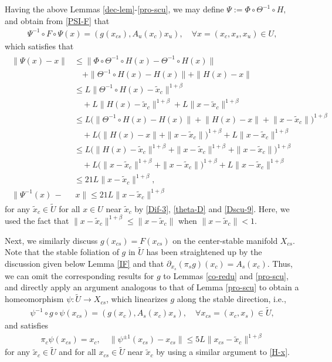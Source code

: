 \documentclass[reqno]{amsart}
\numberwithin{equation}{section}
\begin{document}
Having the above Lemmas \ref{dec-lem}-\ref{pro-scu}, we may define
$
\Psi:=\Phi\circ \Theta^{-1}\circ H,
$
and obtain from \eqref{PSI-F} that
\begin{align}\label{lin-u}
\Psi^{-1}\circ F\circ \Psi(x)=(g(x_{cs}),A_u(x_c)x_u),\quad \forall x=(x_{c},x_s, x_u)\in U,
\end{align}
which satisfies that
\begin{align}\label{H-x}
\begin{split}
\|\Psi(x)-x\|
&\le \|\Phi\circ \Theta^{-1}\circ H(x)-\Theta^{-1}\circ H(x)\|
\\
&\quad +\|\Theta^{-1}\circ H(x)-H(x)\|+\|H(x)-x\|
\\
&\le L\|\Theta^{-1}\circ H(x)-\tilde x_c\|^{1+\beta}
\\
&\quad +L\|H(x)-\tilde x_c\|^{1+\beta}+L\|x-\tilde x_c\|^{1+\beta}
\\
&\le L\Big(\|\Theta^{-1}\circ H(x)\!-\!H(x)\|\!+\!\|H(x)\!-\!x\|\!+\!\|x\!-\!\tilde x_c\|\Big)^{1+\beta}
\\
&\quad+L\Big(\|H(x)-x\|+\|x-\tilde x_c\|\Big)^{1+\beta}+L\|x-\tilde x_c\|^{1+\beta}
\\
&\le L\Big(\|H(x)-\tilde x_c\|^{1+\beta}+\|x-\tilde x_c\|^{1+\beta}+\|x-\tilde x_c\|\Big)^{1+\beta}
\\
&\quad+L\Big(\|x-\tilde x_c\|^{1+\beta}+\|x-\tilde x_c\|\Big)^{1+\beta}+L\|x-\tilde x_c\|^{1+\beta}
\\
&\le 21L\|x-\tilde x_c\|^{1+\beta},
\\
\|\Psi^{-1}(x)\,-&\,x\| \le 21L\|x-\tilde x_c\|^{1+\beta}
\end{split}
\end{align}
for any $\tilde x_c\in \tilde U$ for all $x\in U$ near $\tilde x_c$ by \eqref{Dif-3}, \eqref{theta-D} and \eqref{Dscu-9}. Here, we used the fact that $\|x-\tilde x_c\|^{1+\beta}\le \|x-\tilde x_c\|$ when $\|x-\tilde x_c\|<1$.

Next, we similarly discuss $g(x_{cs})=F(x_{cs})$ on the center-stable manifold $X_{cs}$. 
Note that the stable foliation of $g$ in $\tilde U$ has been straightened up by the discussion given    
below Lemma \ref{IF} 
and that $\partial_{x_s}(\pi_s g)(x_{c}) =A_s(x_c)$.
Thus, we can omit the corresponding results for $g$ to Lemmas \ref{co-redu} and \ref{pro-scu}, and directly apply an argument analogous to that of Lemma \ref{pro-scu} to obtain a homeomorphism
$\psi:\tilde U\to X_{cs}$, which linearizes $g$ along the stable direction, i.e.,
\begin{align}\label{lin-s}
\psi^{-1}\circ g\circ \psi(x_{cs})=(g(x_{c}),A_s(x_c)x_s),\quad \forall x_{cs}=(x_{c},x_s)\in \tilde U,
\end{align}
and satisfies
\begin{align}\label{psi-xcs}
\pi_c\psi(x_{cs})=x_c,\quad \|\psi^{\pm 1}(x_{cs})-x_{cs}\|\le 5L\|x_{cs}-\tilde x_c\|^{1+\beta}
\end{align}
for any $\tilde x_c\in \tilde U$ and for all $x_{cs}\in \tilde U$ near $\tilde x_c$ by using a similar argument to \eqref{H-x}.
\end{document}

